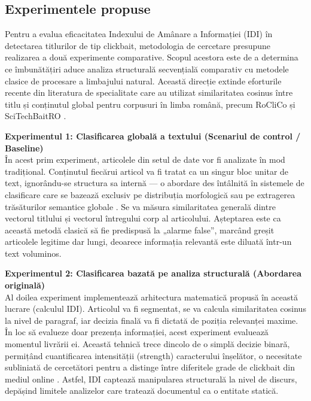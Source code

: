 \documentclass[12pt, a4paper]{article}
\begin{document}
\subsection{Experimentele propuse}

Pentru a evalua eficacitatea Indexului de Amânare a Informației (IDI) în detectarea titlurilor de tip clickbait, metodologia de cercetare presupune realizarea a două experimente comparative. Scopul acestora este de a determina ce îmbunătățiri aduce analiza structurală secvențială comparativ cu metodele clasice de procesare a limbajului natural. Această direcție extinde eforturile recente din literatura de specialitate care au utilizat similaritatea cosinus între titlu și conținutul global pentru corpusuri în limba română, precum RoCliCo \cite{broscoteanu2023} și SciTechBaitRO \cite{ginga2024}.

\textbf{Experimentul 1: Clasificarea globală a textului (Scenariul de control / Baseline)} \\
În acest prim experiment, articolele din setul de date vor fi analizate în mod tradițional. Conținutul fiecărui articol va fi tratat ca un singur bloc unitar de text, ignorându-se structura sa internă --- o abordare des întâlnită în sistemele de clasificare care se bazează exclusiv pe distribuția morfologică sau pe extragerea trăsăturilor semantice globale \cite{vincze2020}. Se va măsura similaritatea generală dintre vectorul titlului și vectorul întregului corp al articolului. Așteptarea este ca această metodă clasică să fie predispusă la „alarme false”, marcând greșit articolele legitime dar lungi, deoarece informația relevantă este diluată într-un text voluminos.

\textbf{Experimentul 2: Clasificarea bazată pe analiza structurală (Abordarea originală)} \\
Al doilea experiment implementează arhitectura matematică propusă în această lucrare (calculul IDI). Articolul va fi segmentat, se va calcula similaritatea cosinus la nivel de paragraf, iar decizia finală va fi dictată de poziția relevanței maxime. În loc să evalueze doar prezența informației, acest experiment evaluează momentul livrării ei. Această tehnică trece dincolo de o simplă decizie binară, permițând cuantificarea intensității (strength) caracterului înșelător, o necesitate subliniată de cercetători pentru a distinge între diferitele grade de clickbait din mediul online \cite{indurthi2020}. Astfel, IDI captează manipularea structurală la nivel de discurs, depășind limitele analizelor care tratează documentul ca o entitate statică.
\end{document}
